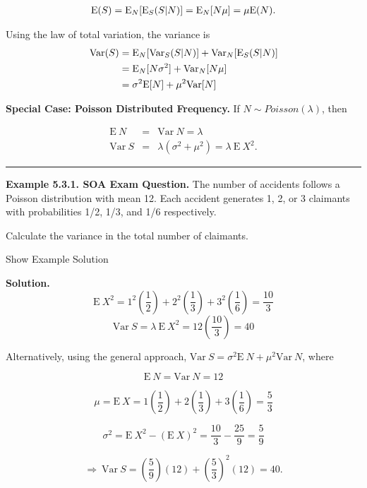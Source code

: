 \documentclass[]{book}
\theoremstyle{definition}
\theoremstyle{definition}
\theoremstyle{definition}
\theoremstyle{remark}
\begin{document}
\begin{eqnarray*}
{\rm E}(S)={\rm E}_N[{\rm E}_S(S|N)] = {\rm E}_N[N\mu] = \mu {\rm E}(N).
\end{eqnarray*}

Using the law of total variation, the variance is \[\begin{aligned}
{\rm Var}(S) &= {\rm E}_N[{\rm Var}_S(S|N)] + {\rm Var}_N[{\rm E}_S(S|N)] \\
&={\rm E}_N[N\sigma^2] + {\rm Var}_N[N\mu] \\
&=\sigma^2{\rm E}[N] + \mu^2{\rm Var}[N]
\end{aligned}\]

\textbf{Special Case: Poisson Distributed Frequency.} If
\(N \sim Poisson (\lambda)\), then

\begin{eqnarray*}
\mathrm{E~}N &=& \mathrm{Var~}N = \lambda\\
\mathrm{Var~}S &=& \lambda (\sigma^2 + \mu^2) = \lambda ~\mathrm{E~} X^2 .
\end{eqnarray*}

\begin{center}\rule{0.5\linewidth}{\linethickness}\end{center}

\textbf{Example 5.3.1. SOA Exam Question.} The number of accidents
follows a Poisson distribution with mean 12. Each accident generates 1,
2, or 3 claimants with probabilities 1/2, 1/3, and 1/6 respectively.

Calculate the variance in the total number of claimants.

Show Example Solution

\hypertarget{toggleExampleAggLoss.3.1}{}
\textbf{Solution.}
\[\mathrm{E~}X^2 = 1^2 \left( \frac{1}{2}\right) + 2^2\left(\frac{1}{3} \right) + 3^2\left(\frac{1}{6}\right)
= \frac{10}{3}\]
\[\mathrm{Var~}S = \lambda \ \mathrm{E~}X^2 = 12\left(\frac{10}{3}\right) = 40\]

Alternatively, using the general approach,
\(\mathrm{Var~}S = \sigma^2 \mathrm{E~}N + \mu^2 \mathrm{Var~}N\), where

\[\mathrm{E~}N = \mathrm{Var~}N = 12\]

\[\mu = \mathrm{E~}X = 1\left(\frac{1}{2}\right) + 2\left(\frac{1}{3}\right) + 3\left(\frac{1}{6}\right)
= \frac{5}{3}\]

\[\sigma^2 = \mathrm{E~}X^2 - (\mathrm{E~}X)^2 = \frac{10}{3} - \frac{25}{9}
= \frac{5}{9}\]

\[\Rightarrow \ \mathrm{Var~}S = \left(\frac{5}{9}\right)\left(12\right) + \left(\frac{5}{3}\right)^2\left(12\right) = 40 .\]
\end{document}
